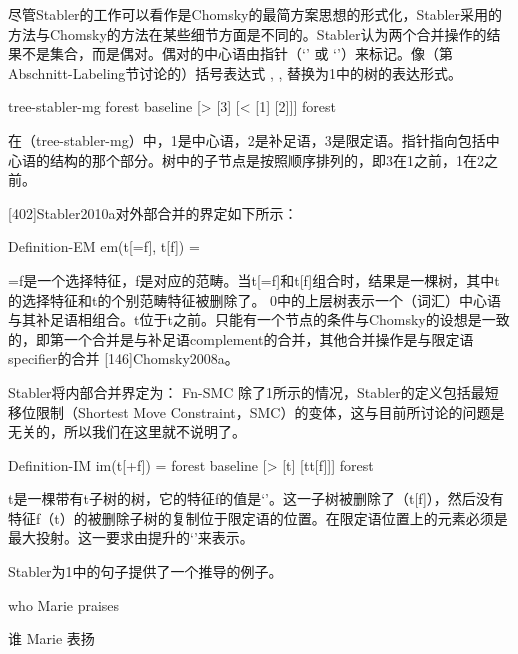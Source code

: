 尽管Stabler的工作可以看作是Chomsky的最简方案思想的形式化，Stabler采用的方法与Chomsky的方法在某些细节方面是不同的。Stabler认为两个合并操作的结果不是集合，而是偶对。偶对的中心语由指针（`' 或 `'）来标记。像（第 Abschnitt-Labeling节讨论的）括号表达式 ,  ,    替换为1中的树的表达形式。






tree-stabler-mg
forest
baseline
[>
 [3]
 [<
   [1]
   [2]]]
forest

在（tree-stabler-mg）中，1是中心语，2是补足语，3是限定语。指针指向包括中心语的结构的那个部分。树中的子节点是按照顺序排列的，即3在1之前，1在2之前。




[402]Stabler2010a对外部合并的界定如下所示：


Definition-EM
em(t[=f], t[f]) = 













=f是一个选择特征，f是对应的范畴。当t[=f]和t[f]组合时，结果是一棵树，其中t的选择特征和t的个别范畴特征被删除了。 0中的上层树表示一个（词汇）中心语与其补足语相组合。t位于t之前。只能有一个节点的条件与Chomsky的设想是一致的，即第一个合并是与补足语complement的合并，其他合并操作是与限定语specifier的合并 [146]Chomsky2008a。







Stabler将内部合并界定为： Fn-SMC
除了1所示的情况，Stabler的定义包括最短移位限制（Shortest Move Constraint，SMC）的变体，这与目前所讨论的问题是无关的，所以我们在这里就不说明了。





Definition-IM
im(t[+f]) = forest
                baseline
                [>
                  [t]
                  [tt[f]]]
forest

t是一棵带有t子树的树，它的特征f的值是`'。这一子树被删除了（t[f]），然后没有特征f（t）的被删除子树的复制位于限定语的位置。在限定语位置上的元素必须是最大投射。这一要求由提升的`'来表示。






Stabler为1中的句子提供了一个推导的例子。


who Marie praises

谁 Marie 表扬

